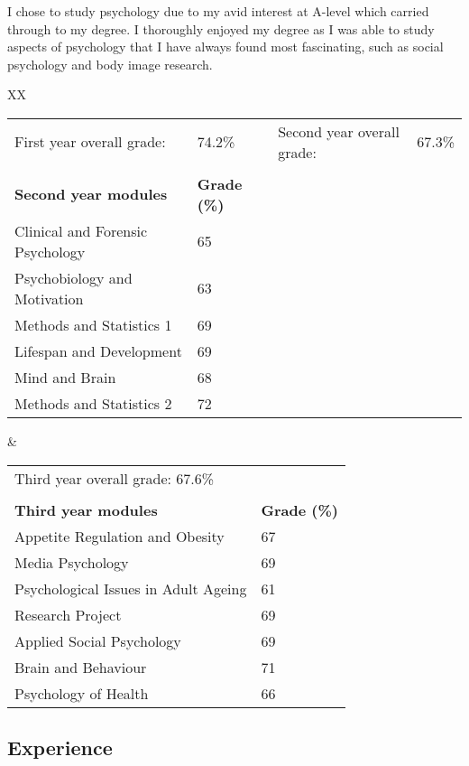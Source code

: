 \documentclass[11pt,a4paper]{article}
\begin{document}
I chose to study psychology due to my avid interest at A-level which carried
through to my degree. I thoroughly enjoyed my degree as I was able to study
aspects of psychology that I have always found most fascinating, such as social
psychology and body image research.

\begin{tabularx}{\linewidth}{XX}
  \begin{flushleft}
    \begin{tabular}{ll}
      First year overall grade: & 74.2\% & Second year overall grade: & 67.3\% \\
      \\
      \textbf{Second year modules} & \textbf{Grade (\%)}\\
      Clinical and Forensic Psychology & 65\\
      Psychobiology and Motivation & 63\\
      Methods and Statistics 1& 69\\
      Lifespan and Development &69\\
      Mind and Brain& 68\\
      Methods and Statistics 2&72\\
    \end{tabular}
  \end{flushleft}
  &
  \begin{flushright}
    \begin{tabular}{ll}
      \\
      Third year overall grade: 67.6\% \\
      \\
      \textbf{Third year modules} & \textbf{Grade (\%)}\\
      Appetite Regulation and Obesity &67\\
      Media Psychology & 69\\
      Psychological Issues in Adult Ageing& 61\\
      Research Project & 69\\
      Applied Social Psychology & 69\\
      Brain and Behaviour & 71\\
      Psychology of Health & 66\\
    \end{tabular}
  \end{flushright}    
\end{tabularx}

\subsection*{Experience}
\end{document}
